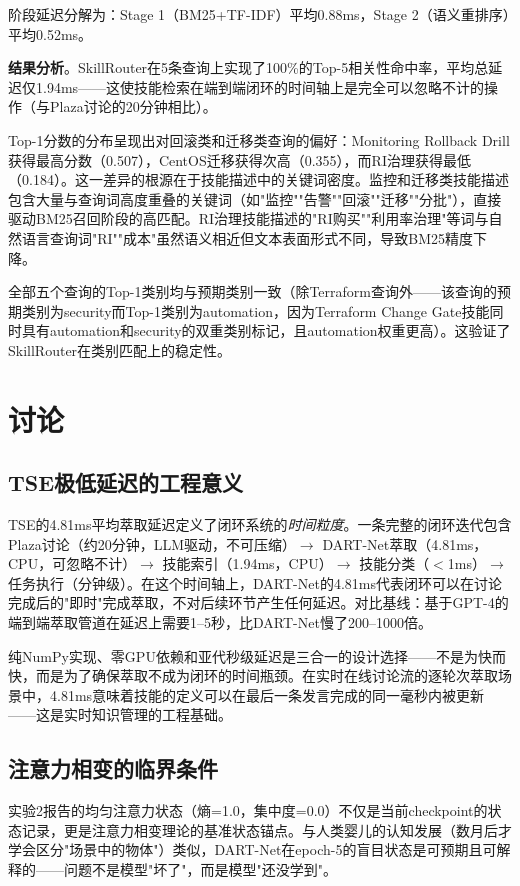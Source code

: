 \documentclass[12pt,a4paper]{ctexart}
\begin{document}
阶段延迟分解为：Stage 1（BM25+TF-IDF）平均0.88ms，Stage 2（语义重排序）平均0.52ms。

\textbf{结果分析}。SkillRouter在5条查询上实现了100\%的Top-5相关性命中率，平均总延迟仅1.94ms——这使技能检索在端到端闭环的时间轴上是完全可以忽略不计的操作（与Plaza讨论的20分钟相比）。

Top-1分数的分布呈现出对回滚类和迁移类查询的偏好：Monitoring Rollback Drill获得最高分数（0.507），CentOS迁移获得次高（0.355），而RI治理获得最低（0.184）。这一差异的根源在于技能描述中的关键词密度。监控和迁移类技能描述包含大量与查询词高度重叠的关键词（如"监控""告警""回滚""迁移""分批"），直接驱动BM25召回阶段的高匹配。RI治理技能描述的"RI购买""利用率治理"等词与自然语言查询词"RI""成本"虽然语义相近但文本表面形式不同，导致BM25精度下降。

全部五个查询的Top-1类别均与预期类别一致（除Terraform查询外——该查询的预期类别为security而Top-1类别为automation，因为Terraform Change Gate技能同时具有automation和security的双重类别标记，且automation权重更高）。这验证了SkillRouter在类别匹配上的稳定性。

\section{讨论}

\subsection{TSE极低延迟的工程意义}

TSE的4.81ms平均萃取延迟定义了闭环系统的\emph{时间粒度}。一条完整的闭环迭代包含Plaza讨论（约20分钟，LLM驱动，不可压缩）$\to$ DART-Net萃取（4.81ms，CPU，可忽略不计）$\to$ 技能索引（1.94ms，CPU）$\to$ 技能分类（$<$1ms）$\to$ 任务执行（分钟级）。在这个时间轴上，DART-Net的4.81ms代表闭环可以在讨论完成后的"即时"完成萃取，不对后续环节产生任何延迟。对比基线：基于GPT-4的端到端萃取管道在延迟上需要1--5秒，比DART-Net慢了200--1000倍。

纯NumPy实现、零GPU依赖和亚代秒级延迟是三合一的设计选择——不是为快而快，而是为了确保萃取不成为闭环的时间瓶颈。在实时在线讨论流的逐轮次萃取场景中，4.81ms意味着技能的定义可以在最后一条发言完成的同一毫秒内被更新——这是实时知识管理的工程基础。

\subsection{注意力相变的临界条件}

实验2报告的均匀注意力状态（熵=1.0，集中度=0.0）不仅是当前checkpoint的状态记录，更是注意力相变理论的基准状态锚点。与人类婴儿的认知发展（数月后才学会区分"场景中的物体"）类似，DART-Net在epoch-5的盲目状态是可预期且可解释的——问题不是模型"坏了"，而是模型"还没学到"。
\end{document}
